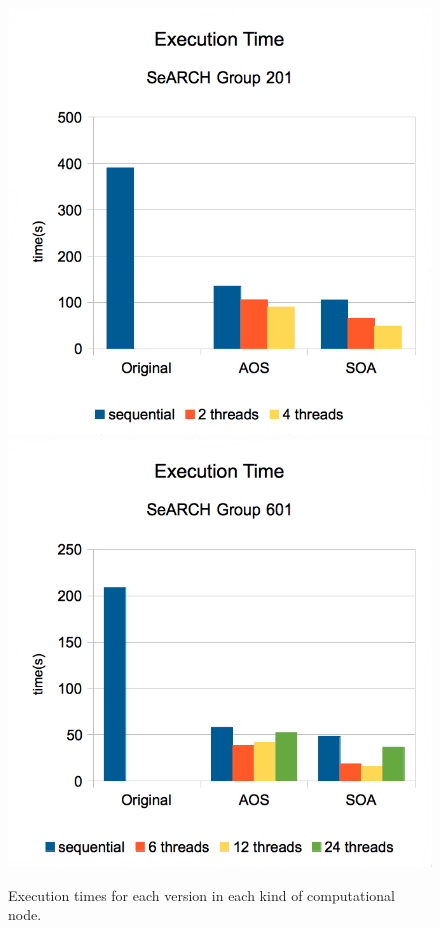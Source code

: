 \documentclass[abstract=on,9pt,twocolumn]{scrartcl}
\begin{document}
\begin{figure}[!p]
	\begin{center}
		\includegraphics[width=\columnwidth]{images/report.april/time201.png}
		\includegraphics[width=\columnwidth]{images/report.april/time601.png}
		\caption[Execution Times]{Execution times for each version in each kind of computational node.}
		\label{fig:executiontime}
	\end{center}
\end{figure}
\end{document}
